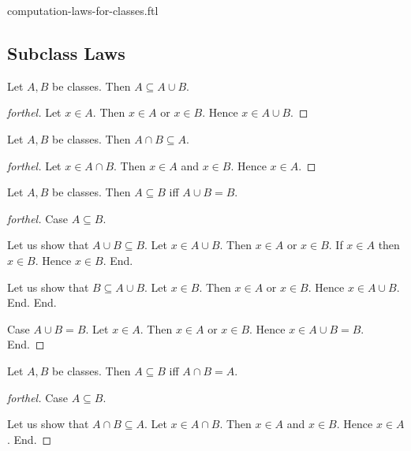 \documentclass{naproche-library}
\begin{document}
\begin{smodule}{computation-laws-for-classes.ftl}
  \subsection*{Subclass Laws}

  \begin{proposition}[forthel,id=FOUNDATIONS_02_3793981508943872,printid]
    Let $A, B$ be classes.
    Then $A \subseteq A \cup B$.
  \end{proposition}
  \begin{proof}[forthel]
    Let $x \in A$.
    Then $x \in A$ or $x \in B$.
    Hence $x \in A \cup B$.
  \end{proof}

  \begin{proposition}[forthel,id=FOUNDATIONS_02_1591517646946304,printid]
    Let $A, B$ be classes.
    Then $A \cap B \subseteq A$.
  \end{proposition}
  \begin{proof}[forthel]
    Let $x \in A \cap B$.
    Then $x \in A$ and $x \in B$.
    Hence $x \in A$.
  \end{proof}

  \begin{proposition}[forthel,id=FOUNDATIONS_02_6657236858306560,printid]
    Let $A, B$ be classes.
    Then $A \subseteq B$ iff $A \cup B = B$.
  \end{proposition}
  \begin{proof}[forthel]
    Case $A \subseteq B$.

      Let us show that $A \cup B \subseteq B$.
        Let $x \in A \cup B$.
        Then $x \in A$ or $x \in B$.
        If $x \in A$ then $x \in B$.
        Hence $x \in B$.
      End.

      Let us show that $B \subseteq A \cup B$.
        Let $x \in B$.
        Then $x \in A$ or $x \in B$.
        Hence $x \in A \cup B$.
      End.
    End.

    Case $A \cup B = B$.
      Let $x \in A$.
      Then $x \in A$ or $x \in B$.
      Hence $x \in A \cup B = B$.
    End.
  \end{proof}

  \begin{proposition}[forthel,id=FOUNDATIONS_02_2356449346846720,printid]
    Let $A, B$ be classes.
    Then $A \subseteq B$ iff $A \cap B = A$.
  \end{proposition}
  \begin{proof}[forthel]
    Case $A \subseteq B$.

      Let us show that $A \cap B \subseteq A$.
        Let $x \in A \cap B$.
        Then $x \in A$ and $x \in B$.
        Hence $x \in A$.
      End.


\end{proof}
\end{smodule}
\end{document}
